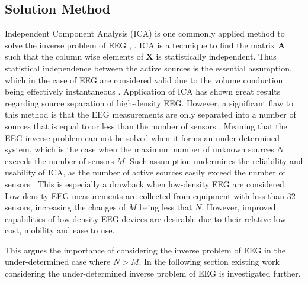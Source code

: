 \subsection{Solution Method}\label{sec:ICAsolution}
Independent Component Analysis (ICA) is one commonly applied method to solve the inverse problem of EEG \cite{Scott1996}, \cite{Scott1997}. ICA is a technique to find the matrix $\mathbf{A}$ such that the column wise elements of $\mathbf{X}$ is statistically independent. Thus statistical independence between the active sources is the essential assumption, which in the case of EEG are considered valid due to the volume conduction being effectively instantaneous \cite[p. 3]{Scott1997}. 
Application of ICA has shown great results regarding source separation of high-density EEG. 
However, a significant flaw to this method is that the EEG measurements are only separated into a number of sources that is equal to or less than the number of sensors \cite{Balkan2015}.
Meaning that the EEG inverse problem can not be solved when it forms an under-determined system, which is the case when the maximum number of unknown sources $N$ exceeds the number of sensors $M$. 
Such assumption undermines the reliability and usability of ICA, as the number of active sources easily exceed the number of sensors \cite{phd2015}. 
This is especially a drawback when low-density EEG are considered. Low-density EEG measurements are collected from equipment with less than 32 sensors, increasing the changes of $M$ being less that $N$. 
However, improved capabilities of low-density EEG devices are desirable due to their relative low cost, mobility and ease to use. 

This argues the importance of considering the inverse problem of EEG in the under-determined case where $N>M$. In the following section existing work considering the under-determined inverse problem of EEG is investigated further. 

